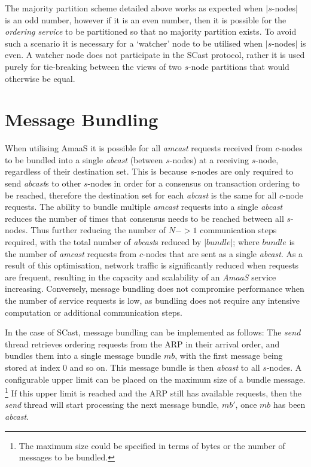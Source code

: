     The majority partition scheme detailed above works as expected when $|s$-nodes$|$ is an odd number, however if it is an even number, then it is possible for the \emph{ordering service} to be partitioned so that no majority partition exists.  To avoid such a scenario it is necessary for a \textquoteleft{}watcher' node to be utilised when $|s$-nodes$|$ is even.  A watcher node does not participate in the \textsf{SCast} protocol, rather it is used purely for tie-breaking between the views of two $s$-node partitions that would otherwise be equal.  

\section{Message Bundling}\label{ssec:abaas_optimisations}
		When utilising \textsf{AmaaS} it is possible for all \emph{amcast} requests received from $c$-nodes to be bundled into a single \emph{abcast} (between $s$-nodes) at a receiving $s$-node, regardless of their destination set.  This is because $s$-nodes are only required to send \emph{abcast}s to other $s$-nodes in order for a consensus on transaction ordering to be reached, therefore the destination set for each \emph{abcast} is the same for all $c$-node requests.   The ability to bundle multiple \emph{amcast} requests into a single \emph{abcast} reduces the number of times that consensus needs to be reached between all $s$-nodes.  Thus further reducing the number of $N->1$ communication steps required, with the total number of \emph{abcast}s reduced by $\left\vert bundle \right\vert$; where $bundle$ is the number of  \emph{amcast} requests from $c$-nodes that are sent as a single \emph{abcast}.  As a result of this optimisation, network traffic is significantly reduced when requests are frequent, resulting in the capacity and scalability of an \emph{AmaaS} service increasing. Conversely, message bundling does not compromise performance when the number of service requests is low, as bundling does not require any intensive computation or additional communication steps.  
    
    In the case of \textsf{SCast}, message bundling can be implemented as follows: The \emph{send} thread retrieves ordering requests from the ARP in their arrival order, and bundles them into a single message bundle $mb$, with the first message being stored at index 0 and so on.  This message bundle is then \emph{abcast} to all $s$-nodes.  A configurable upper limit can be placed on the maximum size of a bundle message. \footnote{The maximum size could be specified in terms of bytes or the number of messages to be bundled.} If this upper limit is reached and the ARP still has available requests, then the \emph{send} thread will start processing the next message bundle, $mb'$, once $mb$ has been \emph{abcast}.  
    
